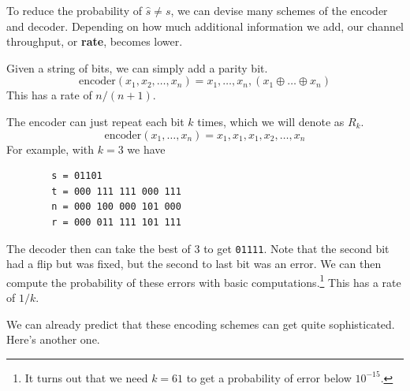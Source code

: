 \documentclass{article}
\begin{document}
    To reduce the probability of $\hat{s} \neq s$, we can devise many schemes of the encoder and decoder. Depending on how much additional information we add, our channel throughput, or \textbf{rate}, becomes lower. 

    \begin{definition}
      Given a string of bits, we can simply add a parity bit. 
      \begin{equation}
        \mathrm{encoder}(x_1, x_2, \ldots, x_n) = x_1, \ldots, x_n, (x_1 \oplus \ldots \oplus x_n)
      \end{equation}
      This has a rate of $n/(n+1)$. 
    \end{definition}

    \begin{definition}[Repetition]
      The encoder can just repeat each bit $k$ times, which we will denote as $R_k$. 
      \begin{equation}
        \mathrm{encoder}(x_1, \ldots, x_n) = x_1, x_1, x_1, x_2, \ldots, x_n
      \end{equation}
      For example, with $k = 3$ we have 
      \begin{lstlisting}
        s = 01101 
        t = 000 111 111 000 111 
        n = 000 100 000 101 000 
        r = 000 011 111 101 111
      \end{lstlisting}
      The decoder then can take the best of 3 to get \texttt{01111}. Note that the second bit had a flip but was fixed, but the second to last bit was an error. We can then compute the probability of these errors with basic computations.\footnote{It turns out that we need $k = 61$ to get a probability of error below $10^{-15}$.} This has a rate of $1/k$. 
    \end{definition}

    We can already predict that these encoding schemes can get quite sophisticated. Here's another one. 
\end{document}
